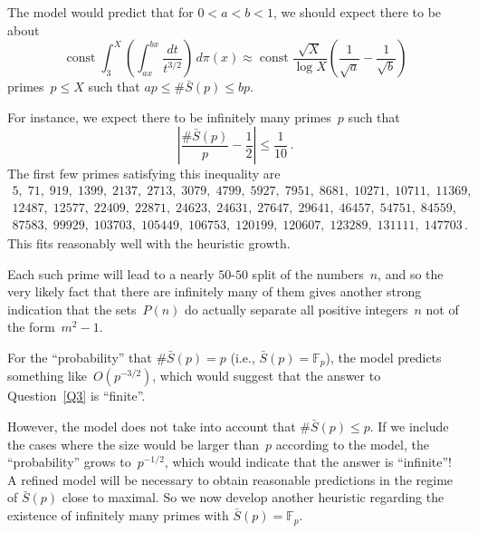 \documentclass[12pt,a4paper]{amsart}
\newcommand{\F}{{\mathbb F}}
\theoremstyle{definition}
\numberwithin{equation}{section}
\begin{document}
The model would predict that for $0 < a < b < 1$, we should expect
there to be about
\[ \operatorname{const} \int_3^X \left(\int_{ax}^{bx} \frac{dt}{t^{3/2}}\right)\, d\pi(x)
     \approx \operatorname{const} \frac{\sqrt{X}}{\log X} \left(\frac{1}{\sqrt{a}} - \frac{1}{\sqrt{b}}\right)
\]
primes~$p \leqslant X$ such that $a p \leqslant \#\bar{S}(p) \leqslant b p$.

For instance, we expect there to be infinitely many primes~$p$ such that
\[ \left|\frac{\#\bar{S}(p)}{p} - \frac{1}{2}\right| \leqslant \frac{1}{10} \,. \]
The first few primes satisfying this inequality are
\begin{gather*}
  5, \; 71, \; 919, \; 1399, \; 2137, \; 2713, \; 3079, \; 4799, \; 5927, \; 7951, \; 8681, \; 10271, \; 10711, \; 11369, \\
  12487, \; 12577, \; 22409, \; 22871, \; 24623, \; 24631, \; 27647, \; 29641, \; 46457, \; 54751, \; 84559, \\
  87583, \; 99929, \; 103703, \; 105449, \; 106753, \; 120199, \; 120607, \; 123289, \; 131111, \; 147703\,.
\end{gather*}
This fits reasonably well with the heuristic growth.

Each such prime will lead to a nearly $50$-$50$ split of the numbers~$n$, and so
the very likely fact that there are infinitely many of them gives another strong indication
that the sets~$P(n)$ do actually separate all positive integers~$n$ not of the form~$m^2 - 1$.


\medskip

For the ``probability'' that $\#\bar{S}(p) = p$ (i.e., $\bar{S}(p) = \F_p$), the model
predicts something like~$O(p^{-3/2})$, which would suggest that the answer to Question~\ref{Q3}
is ``finite''.

However, the model does not take into account that $\#\bar{S}(p) \leqslant p$. If we
include the cases where the size would be larger than~$p$ according to the model,
the ``probability'' grows to~$p^{-1/2}$, which would indicate that the answer is ``infinite''!
A refined model will be necessary to obtain reasonable predictions in the regime
of $\bar{S}(p)$ close to maximal. So we now develop
another heuristic regarding the existence of infinitely many primes with $\bar{S}(p) = \F_p$.
\end{document}
